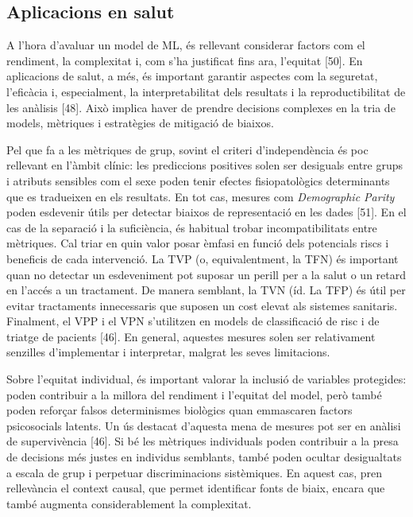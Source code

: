 \documentclass[CAT]{TFUOC}%
\begin{document}
\subsection{Aplicacions en salut}\label{aplicacions-en-salut}

A l'hora d'avaluar un model de ML, és rellevant considerar factors com el rendiment, la complexitat i, com s'ha justificat fins ara, l'equitat {[}50{]}. En aplicacions de salut, a més, és important garantir aspectes com la seguretat, l'eficàcia i, especialment, la interpretabilitat dels resultats i la reproductibilitat de les anàlisis {[}48{]}. Això implica haver de prendre decisions complexes en la tria de models, mètriques i estratègies de mitigació de biaixos.

Pel que fa a les mètriques de grup, sovint el criteri d'independència és poc rellevant en l'àmbit clínic: les prediccions positives solen ser desiguals entre grups i atributs sensibles com el sexe poden tenir efectes fisiopatològics determinants que es tradueixen en els resultats. En tot cas, mesures com \emph{Demographic Parity} poden esdevenir útils per detectar biaixos de representació en les dades {[}51{]}. En el cas de la separació i la suficiència, és habitual trobar incompatibilitats entre mètriques. Cal triar en quin valor posar èmfasi en funció dels potencials riscs i beneficis de cada intervenció. La TVP (o, equivalentment, la TFN) és important quan no detectar un esdeveniment pot suposar un perill per a la salut o un retard en l'accés a un tractament. De manera semblant, la TVN (íd. La TFP) és útil per evitar tractaments innecessaris que suposen un cost elevat als sistemes sanitaris. Finalment, el VPP i el VPN s'utilitzen en models de classificació de risc i de triatge de pacients {[}46{]}. En general, aquestes mesures solen ser relativament senzilles d'implementar i interpretar, malgrat les seves limitacions.

Sobre l'equitat individual, és important valorar la inclusió de variables protegides: poden contribuir a la millora del rendiment i l'equitat del model, però també poden reforçar falsos determinismes biològics quan emmascaren factors psicosocials latents. Un ús destacat d'aquesta mena de mesures pot ser en anàlisi de supervivència {[}46{]}. Si bé les mètriques individuals poden contribuir a la presa de decisions més justes en individus semblants, també poden ocultar desigualtats a escala de grup i perpetuar discriminacions sistèmiques. En aquest cas, pren rellevància el context causal, que permet identificar fonts de biaix, encara que també augmenta considerablement la complexitat.
\end{document}
